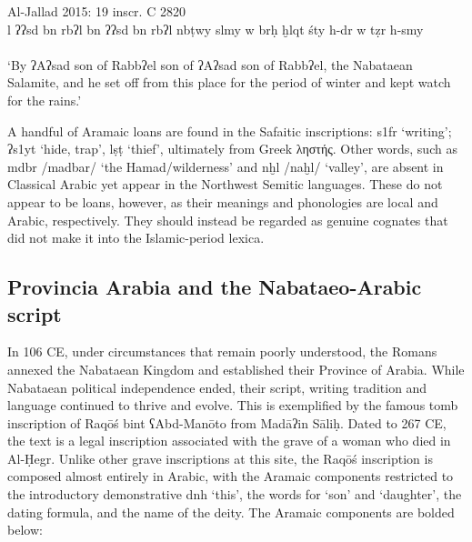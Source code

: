 \documentclass[output=paper]{langsci/langscibook}
\begin{document}
\ea Al-Jallad 2015: 19 inscr. C 2820 \\ 
\gll l ʔʔsd bn rbʔl bn ʔʔsd bn rbʔl nbṭwy slmy w brḥ ḫlqt śty h-dr w tẓr h-smy \\
    \\ %
\glt `By ʔAʔsad son of Rabbʔel son of  ʔAʔsad son of Rabbʔel, the Nabataean Salamite, and he set off from this place for the period of winter and kept watch for the rains.' \\
\z

A handful of Aramaic loans are found in the Safaitic inscriptions: s1fr ‘writing’; ʔs1yt ‘hide, trap’, lṣṭ ‘thief’, ultimately from Greek ληστής. Other words, such as mdbr /madbar/ ‘the Hamad/wilderness’ and nḫl /naḫl/ ‘valley’, are absent in Classical Arabic yet appear in the Northwest Semitic languages. These do not appear to be loans, however, as their meanings and phonologies are local and Arabic, respectively. They should instead be regarded as genuine cognates that did not make it into the Islamic-period lexica. 

\subsection{Provincia Arabia and the Nabataeo-Arabic script}
In 106 CE, under circumstances that remain poorly understood, the Romans annexed the Nabataean Kingdom and established their Province of Arabia. While Nabataean political independence ended, their script, writing tradition and language continued to thrive and evolve. This is exemplified by the famous tomb inscription of Raqōś bint ʕAbd-Manōto from Madāʔin Sāliḥ. Dated to 267 CE, the text is a legal inscription associated with the grave of a woman who died in Al-Ḥegr. Unlike other grave inscriptions at this site, the Raqōś inscription is composed almost entirely in Arabic, with the Aramaic components restricted to the introductory demonstrative dnh ‘this’, the words for ‘son’ and ‘daughter’, the dating formula, and the name of the deity. The Aramaic components are bolded below:
\end{document}
